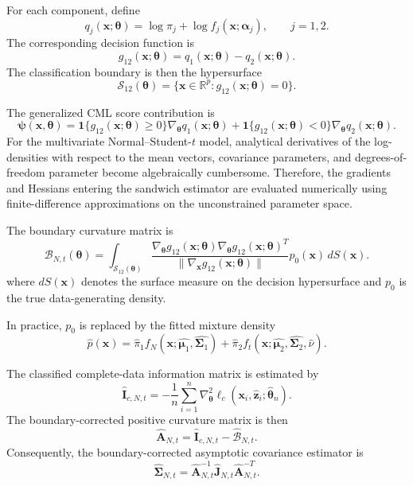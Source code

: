 \documentclass[pdflatex,sn-mathphys-ay]{sn-jnl}%
\let\oldtheta\theta
\renewcommand{\theta}{\boldsymbol{\oldtheta}}
\let\oldalpha\alpha
\renewcommand{\alpha}{\boldsymbol{\oldalpha}}
\let\oldmu\mu
\renewcommand{\mu}{\boldsymbol{\oldmu}}
\let\oldSigma\Sigma
\renewcommand{\Sigma}{\boldsymbol{\oldSigma}}
\theoremstyle{thmstyleone}%
\theoremstyle{thmstyletwo}%
\theoremstyle{thmstylethree}%
\begin{document}
For each component, define
\[
    q_j(\mathbf{x};\theta)
    =
    \log \pi_j
    +
    \log f_j(\mathbf{x};\boldsymbol{\alpha}_j),
    \qquad j=1,2.
\]
The corresponding decision function is
\[
    g_{12}(\mathbf{x};\boldsymbol{\theta})
    =
    q_1(\mathbf{x};\boldsymbol{\theta})
    -
    q_2(\mathbf{x};\boldsymbol{\theta}).
\]
The classification boundary is then the hypersurface
\[
    \mathcal S_{12}(\boldsymbol{\theta})
    =
    \{\mathbf{x}\in\mathbb R^p:
    g_{12}(\mathbf{x};\boldsymbol{\theta})=0\}.
\]

The generalized CML score contribution is
\[
    \boldsymbol{\psi}(\mathbf{x},\boldsymbol{\theta})
    =
    \mathbf 1
    \{
    g_{12}(\mathbf{x};\boldsymbol{\theta})\geq 0
    \}
    \nabla_{\boldsymbol{\theta}} q_1(\mathbf{x};\boldsymbol{\theta})
    +
    \mathbf 1
    \{
    g_{12}(\mathbf{x};\boldsymbol{\theta})<0
    \}
    \nabla_{\boldsymbol{\theta}} q_2(\mathbf{x};\boldsymbol{\theta}).
\]
For the multivariate Normal--Student-$t$ model, analytical derivatives of the log-densities with respect to the mean vectors, covariance parameters, and degrees-of-freedom parameter become algebraically cumbersome. Therefore, the gradients and Hessians entering the sandwich estimator are evaluated numerically using finite-difference approximations on the unconstrained parameter space.

The boundary curvature matrix is
\[
    \mathcal B_{N,t}(\boldsymbol{\theta})
    =
    \int_{\mathcal S_{12}(\boldsymbol{\theta})}
    \frac{
        \nabla_{\boldsymbol{\theta}} g_{12}(\mathbf{x};\boldsymbol{\theta})
        \nabla_{\boldsymbol{\theta}} g_{12}(\mathbf{x};\boldsymbol{\theta})^T
    }{
        \|
        \nabla_\mathbf{x} g_{12}(\mathbf{x};\boldsymbol{\theta})
        \|
    }
    p_0(\mathbf{x})
    \, dS(\mathbf{x}).
\]
where $dS(\mathbf{x})$ denotes the surface measure on the decision hypersurface and $p_0$ is the true data-generating density.

In practice, $p_0$ is replaced by the fitted mixture density
\[
    \widehat p(\mathbf{x})
    =
    \widehat\pi_1
    f_N(\mathbf{x};\widehat{\boldsymbol{\mu}_1},\widehat{\boldsymbol{\Sigma}_1})
    +
    \widehat\pi_2
    f_t(\mathbf{x};\widehat{\boldsymbol{\mu}_2},\widehat{\boldsymbol{\Sigma}_2},\widehat\nu).
\]

The classified complete-data information matrix is estimated by
\[
    \widehat{\mathbf I}_{c,N,t}
    =
    -
    \frac{1}{n}
    \sum_{i=1}^n
    \nabla_{\boldsymbol{\theta}}^2
    \ell_c
    (
        \mathbf{x}_i,
        \widehat{\mathbf{z}}_i;
        \widehat{\boldsymbol{\theta}}_n
    ).
\]
The boundary-corrected positive curvature matrix is then
\[
    \widehat{\mathbf A}_{N,t}
    =
    \widehat{\mathbf I}_{c,N,t}
    -
    \widehat{\mathcal B}_{N,t}.
\]
Consequently, the boundary-corrected asymptotic covariance estimator is
\[
    \widehat{\boldsymbol{\Sigma}}_{N,t}
    =
    \widehat{\mathbf A}_{N,t}^{-1}
    \widehat{\mathbf J}_{N,t}
    \widehat{\mathbf A}_{N,t}^{-T}.
\]
\end{document}
